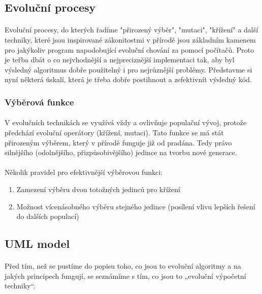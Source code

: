 \documentclass[bc,male,java,dept460]{diploma}		%
\begin{document}
\subsection{Evoluční procesy}
\paragraph*{}
Evoluční procesy, do kterých řadíme "přirozený výběr", "mutaci", "křížení" a další techniky, které jsou inspirované zákonitostmi v přírodě jsou základním kamenem pro jakýkoliv program napodobující evoluční chování za pomocí počítačů. Proto je teřba dbát o co nejvhodnější a nejpreciznější implementaci tak, aby byl výsledný algoritmus dobře použitelný i pro nejrůznější problémy. Představme si nyní některá úskalí, která je třeba dobře postihnout a zefektivnít výsledný kód.

\subsubsection{Výběrová funkce}
\paragraph*{}
V evolučních technikách se využívá vždy a ovlivňuje populační vývoj, protože předchází evoluční operátory (křížení, mutaci). Tato funkce se má stát přirozeným výběrem, který v přírodě funguje již od pradána. Tedy právo silnějšího (odolnějšího, přizpůsobivějšího) jedince na tvorbu nové generace.
\paragraph*{}
Několik pravidel pro efektivnější výběrovou funkci:
\begin{enumerate}
\item Zamezení výběru dvou totožných jedinců pro křížení
\item Možnost vícenásobného výběru stejného jedince (posílení vlivu lepších řešení do dalších populací)
\end{enumerate}

\subsection{UML model}
\paragraph*{}
Před tím, než se pustíme do popisu toho, co jsou to evoluční algoritmy a na jakých principech fungují, se seznámíme s tím, co jsou to „evoluční výpočetní techniky“.
\end{document}
